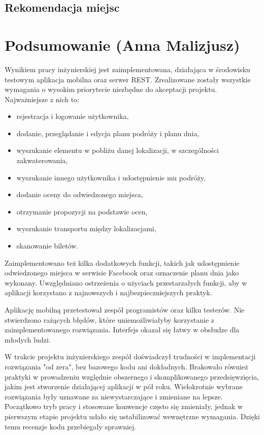 \documentclass[10pt,twoside,a4paper]{report}
\begin{document}
\section{Rekomendacja miejsc}

\chapter{Podsumowanie (Anna Malizjusz)}

\par Wynikiem pracy inżynierskiej jest zaimplementowana, działająca w środowisku testowym aplikacja mobilna oraz serwer REST. Zrealizowane zostały wszystkie wymagania o wysokim priorytecie niezbędne do akceptacji projektu. Najważniejsze z nich to:
\begin{itemize}
\item rejestracja i logowanie użytkownika,
\item dodanie, przeglądanie i edycja planu podróży i planu dnia,
\item wyszukanie elementu w pobliżu danej lokalizacji, w szczególności zakwaterowania,
\item wyszukanie innego użytkownika i udostępnienie mu podróży,
\item dodanie oceny do odwiedzonego miejsca,
\item otrzymanie propozycji na podstawie ocen,
\item wyszukanie transportu między lokalizacjami,
\item skanowanie biletów.
\end{itemize}

\par Zaimplementowano też kilka dodatkowych funkcji, takich jak udostępnienie odwiedzonego miejsca w serwisie Facebook oraz oznaczenie planu dnia jako wykonany. Uwzględniano ostrzeżenia o użyciach przestarzałych funkcji, aby w aplikacji korzystano z najnowszych i najbezpieczniejszych praktyk.

\par Aplikację mobilną przetestował zespół programistów oraz kilku testerów. Nie stwierdzono rażących błędów, które uniemożliwiałyby korzystanie z zaimplementowanego rozwiązania. Interfejs okazał się łatwy w obsłudze dla młodych ludzi.

\par W trakcie projektu inżynierskiego zespół doświadczył trudności w implementacji rozwiązania "od zera", bez bazowego kodu ani dokładnych. Brakowało również praktyki w prowadzeniu względnie obszernego i skomplikowanego przedsięwzięcia, jakim jest stworzenie działającej aplikacji w pół roku. Wielokrotnie wybrane rozwiązania były uznawane za niewystarczające i zmieniane na lepsze. Początkowo tryb pracy i stosowane konwencje często się zmieniały, jednak w pierwszym etapie projektu udało się ustabilizować wewnętrzne wymagania. Dzięki temu recenzje kodu przebiegały sprawniej.
\end{document}
